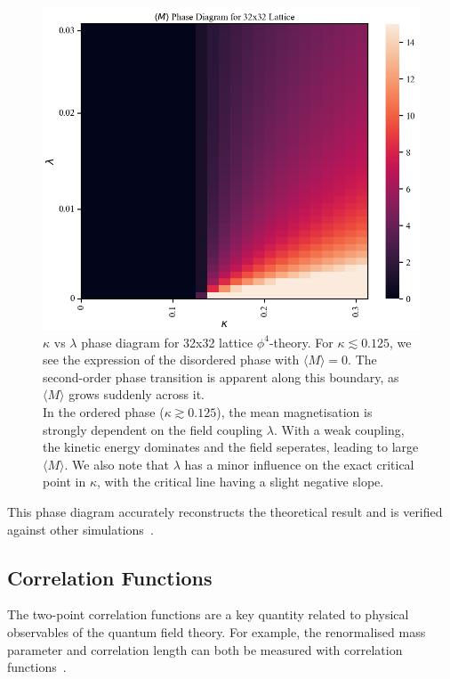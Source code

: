 \documentclass[11pt]{article}
\begin{document}
    \begin{figure}[h!]
        \center
        \includegraphics[width=\linewidth]{../figures/PhaseDiagram}
        \caption{
            $\kappa$ vs $\lambda$ phase diagram for 32x32 lattice $\phi^4$-theory.
            For $\kappa \lesssim 0.125$, we see the expression of the disordered phase with $\langle M \rangle = 0$.
            The second-order phase transition is apparent along this boundary, as $\langle M \rangle$ grows suddenly
            across it. \\
            In the ordered phase ($\kappa \gtrsim 0.125$), the mean magnetisation is strongly dependent on the field
            coupling $\lambda$.
            With a weak coupling, the kinetic energy dominates and the field seperates, leading to
            large $\langle M \rangle$.
            We also note that $\lambda$ has a minor influence on the exact critical point in $\kappa$, with the
            critical line having a slight negative slope.
        }\label{fig:phase_diagram}
    \end{figure}

    This phase diagram accurately reconstructs the theoretical result and is verified against other
    simulations~\cite{Pawlowski_2020}.

\subsection{Correlation Functions}\label{subsec:correlation_function}
    The two-point correlation functions are a key quantity related to physical
    observables of the quantum field theory.
    For example, the renormalised mass parameter and correlation length can both be measured with correlation
    functions~\cite{maas2020lattice, brower2018lattice}.
\end{document}
